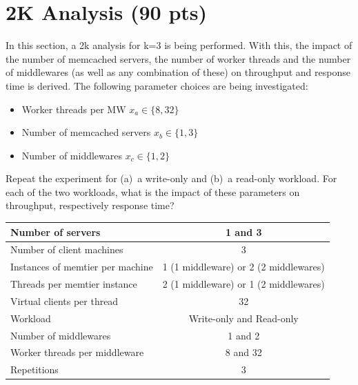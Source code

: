 \documentclass[11pt,a4paper]{article}
\begin{document}
\section{2K Analysis (90 pts)}

In this section, a 2k analysis for k=3 is being performed. With this, the impact of the number of memcached servers, the number of worker threads and the number of middlewares (as well as any combination of these) on throughput and response time is derived. The following parameter choices are being investigated:

\begin{itemize}
		
	\item Worker threads per MW $x_a \in \{8, 32\}$
	\item Number of memcached servers $x_b \in \{1, 3\}$
	\item Number of middlewares $x_c \in \{1,2\}$
	      	      
\end{itemize}

Repeat the experiment for (a)~a write-only and (b)~a read-only workload.
For each of the two workloads, what is the impact of these parameters on throughput, respectively response time?

\begin{center}
	\scriptsize{
		\begin{tabular}{|l|c|}
			\hline Number of servers                & 1 and 3                                     \\ 
			\hline Number of client machines        & 3                                           \\ 
			\hline Instances of memtier per machine & 1 (1 middleware) or 2 (2 middlewares)       \\ 
			\hline Threads per memtier instance     & 2 (1 middleware) or 1 (2 middlewares)       \\
			\hline Virtual clients per thread       & 32                                          \\ 
			\hline Workload                         & Write-only and Read-only                    \\
			\hline Number of middlewares            & 1 and 2                                     \\
			\hline Worker threads per middleware    & 8 and 32                                    \\
			\hline Repetitions                      & 3                                   \\ 
			\hline 
		\end{tabular}
	} 
\end{center}
\end{document}
